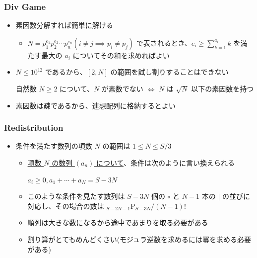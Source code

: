 \documentclass[t, aspectratio=169, dvipdfmx]{beamer}
\newcommand{\perm}[2]{{}_{#1}\mathrm{P}_{#2}}
\begin{document}
\begin{frame}
  \frametitle{Div Game}
  \begin{itemize}
    \item 素因数分解すれば簡単に解ける
    \begin{itemize}
      \item $N=p_{1}^{e_{1}} p_{2}^{e_{2}} \cdots p_{n}^{e_{n}} (i \neq j \implies p_{i} \neq p_{j})$ で表されるとき、$e_i \geq \sum_{k=1}^{a_i}k$ を満たす最大の $a_i$ についてその和を求めればよい
    \end{itemize}
    \item $N \leq 10^{12}$ であるから、$[2,N]$ の範囲を試し割りすることはできない
    \begin{theorem}
      自然数 $N \geq 2$ について、$N$ が素数でない $\iff$ $N$ は $\sqrt{N}$ 以下の素因数を持つ
    \end{theorem}
    \item 素因数は疎であるから、連想配列に格納するとよい
  \end{itemize}
\end{frame}

\begin{frame}
  \frametitle{Redistribution}
  \begin{itemize}
    \item 条件を満たす数列の項数 $N$ の範囲は $1 \leq N \leq S/3$
    \begin{itemize}
      \item \underline{項数 $N$ の数列 $(a_n)$ について}、条件は次のように言い換えられる
      \begin{tcolorbox}
        $a_i \geq 0, a_1+\cdots+a_N=S-3N$
      \end{tcolorbox}
      \item このような条件を見たす数列は $S-3N$ 個の $\circ$ と $N-1$ 本の $|$ の並びに対応し、その場合の数は $\perm{S-2N-1}{S-3N}/(N-1)!$
      \item 順列は大きな数になるから途中であまりを取る必要がある
      \item 割り算がとてもめんどくさい(モジュラ逆数を求めるには冪を求める必要がある)
    \end{itemize}
  \end{itemize}
\end{frame}
\end{document}
